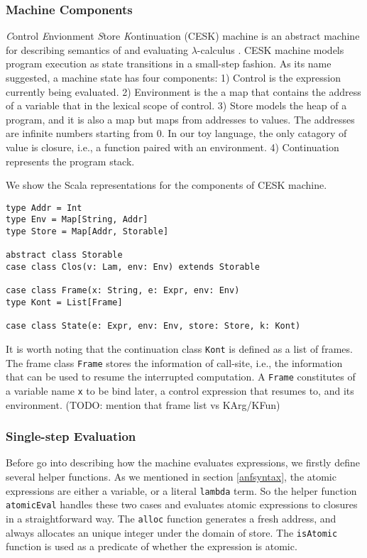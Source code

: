\documentclass[acmsmall,review,anonymous]{acmart}\settopmatter{printfolios=true,printccs=false,printacmref=false}
\begin{document}
\subsubsection{Machine Components}

\textit{C}ontrol \textit{E}nvionment \textit{S}tore \textit{K}ontinuation (CESK) machine is an
abstract machine for describing semantics of and evaluating $\lambda$-calculus \cite{felleisen1987calculus}.
CESK machine models program execution as state transitions in a small-step fashion. As its name suggested,
a machine state has four components: 1) Control is the expression currently being evaluated.
2) Environment is the a map that contains the address of a variable that in the lexical
scope of control.
3) Store models the heap of a program, and it is also a map but maps from addresses to values.
The addresses are infinite numbers starting from 0.
In our toy language, the only catagory of value is closure, i.e., a function paired with an environment.
4) Continuation represents the program stack.

We show the Scala representations for the components of CESK machine.

\begin{verbatim}
type Addr = Int
type Env = Map[String, Addr]
type Store = Map[Addr, Storable]

abstract class Storable
case class Clos(v: Lam, env: Env) extends Storable

case class Frame(x: String, e: Expr, env: Env)
type Kont = List[Frame]

case class State(e: Expr, env: Env, store: Store, k: Kont)
\end{verbatim}

It is worth noting that the continuation class \texttt{Kont} is defined as a list of frames.
The frame class \texttt{Frame} stores the information of call-site, i.e., the information that
can be used to resume the interrupted computation.
A \texttt{Frame} constitutes of a variable name \texttt{x} to be bind later, a control expression
that resumes to, and its environment. (TODO: mention that frame list vs KArg/KFun)

\subsubsection{Single-step Evaluation}
Before go into describing how the machine evaluates expressions, we firstly define several helper functions.
As we mentioned in section \ref{anfsyntax}, the atomic expressions are either a variable, or
a literal \texttt{lambda} term. So the helper function \texttt{atomicEval} handles these two
cases and evaluates atomic expressions to closures in a straightforward way.
The \texttt{alloc} function generates a fresh address, and always allocates an unique integer under the domain
of store.
The \texttt{isAtomic} function is used as a predicate of whether the expression is atomic.
\end{document}
